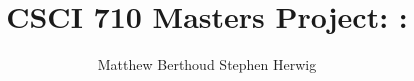 \documentclass[11pt]{article}
\title{CSCI 710 Masters Project: \Name:}
\author{Matthew Berthoud \hspace{4em} Stephen Herwig}
\date{}
\begin{document}
\maketitle

\begin{abstract}

\end{abstract}







\end{document}
